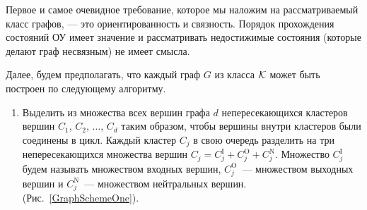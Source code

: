 \documentclass[a4paper,12pt,russian]{extarticle}
\begin{document}
Первое и самое очевидное требование, которое мы наложим на рассматриваемый класс графов, --- это ориентированность и связность. Порядок прохождения состояний ОУ имеет значение и рассматривать недостижимые состояния (которые делают граф несвязным) не имеет смысла.

Далее, будем предполагать, что каждый граф $G$ из класса ${\cal K}$ может быть построен по следующему алгоритму.
\begin{enumerate}
\item Выделить из множества всех вершин графа $d$ непересекающихся кластеров вершин $C_1$, $C_2$, $\ldots$, $C_d$ таким образом, чтобы вершины внутри кластеров были соединены в цикл. Каждый кластер $C_j$ в свою очередь разделить на три непересекающихся множества вершин $C_j=C_j^{\mathrm{I}} + C_j^{\mathrm{O}} + C_j^{\mathrm{N}}$. Множество $C_j^{\mathrm{I}}$ будем называть множеством входных вершин, $C_j^{\mathrm{O}}$~--- множеством выходных вершин и $C_j^{\mathrm{N}}$~--- множеством нейтральных вершин. (Рис.~\ref{GraphSchemeOne}).


\end{enumerate}
\end{document}
